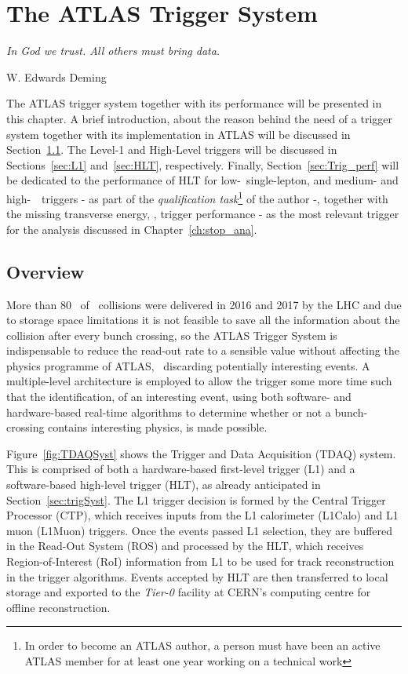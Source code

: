 \chapter{The ATLAS Trigger System}
\label{ch:trigger}
\epigraph{\emph{In God we trust. All others must bring data.}}{W. Edwards Deming}

	The ATLAS trigger system together with its performance will be presented in this chapter. A brief introduction, about the reason behind the need of a trigger system together with its implementation in ATLAS will be discussed in Section~\ref{sec:Trig_intro}. The Level-1 and High-Level triggers will be discussed in Sections~\ref{sec:L1} and~\ref{sec:HLT}, respectively.
	Finally, Section~\ref{sec:Trig_perf} will be dedicated to the performance of HLT for low-\pt\ single-lepton, and medium- and high-\pt\ \bj\ triggers - as part of the \textit{qualification task}\footnote{In order to become an ATLAS author, a person must have been an active ATLAS member for at least one year working on a technical work} of the author -, together with the missing transverse energy, \met, trigger performance - as the most relevant trigger for the analysis discussed in Chapter~\ref{ch:stop_ana}.



	\section{Overview}
	\label{sec:Trig_intro}

		More than 80 \ifb\ of \pp\ collisions were delivered in 2016 and 2017 by the LHC and due to storage space limitations it is not feasible to save all the information about the collision after every bunch crossing, so the ATLAS Trigger System is indispensable to reduce the read-out rate to a sensible value without affecting the physics programme of ATLAS, \eg\ discarding potentially interesting events. A multiple-level architecture is employed to allow the trigger some more time such that the identification, of an interesting event, using both software- and hardware-based real-time algorithms to determine whether or not a bunch-crossing contains interesting physics, is made possible. 

		Figure~\ref{fig:TDAQSyst} shows the Trigger and Data Acquisition (TDAQ) system. This is comprised of both a hardware-based first-level trigger (L1) and a software-based high-level trigger (HLT), as already anticipated in Section~\ref{sec:trigSyst}. The L1 trigger decision is formed by the Central Trigger Processor (CTP), which receives inputs from the L1 calorimeter (L1Calo) and L1 muon (L1Muon) triggers. Once the events passed L1 selection, they are buffered in the Read-Out System (ROS) and processed by the HLT, which receives Region-of-Interest (RoI) information from L1 to be used for track reconstruction in the trigger algorithms. Events accepted by HLT are then transferred to local storage and exported to the \emph{Tier-0} facility at CERN’s computing centre for offline reconstruction.

